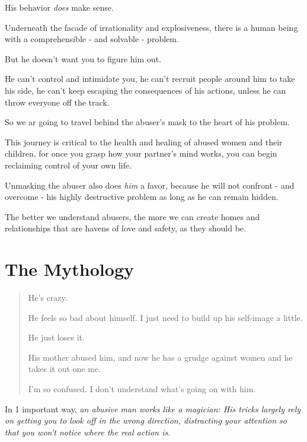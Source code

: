 \documentclass[oneside]{article}
\numberwithin{equation}{section}
\begin{document}
His behavior \textit{does} make sense.

Underneath the facade of irrationality and explosiveness, there is a human being with a comprehensible - and solvable - problem.

But he doesn't want you to figure him out.

%

He can't control and intimidate you, he can't recruit people around him to take his side, he can't keep escaping the consequences of his actions, unless he can throw everyone off the track.


So we ar going to travel behind the abuser's mask to the heart of his problem.

This journey is critical to the health and healing of abused women and their children, for once you grasp how your partner's mind works, you can begin reclaiming control of your own life.

Unmasking the abuser also does \textit{him} a favor, because he will not confront - and overcome - his highly destructive problem as long as he can remain hidden.

%
The better we understand abusers, the more we can create homes and relationships that are havens of love and safety, as they should be.


\section{The Mythology}
\begin{quotation}
    He's crazy.
    
    He feels so bad about himself. I just need to build up his self-image a little.
    
    He just loses it.
    
    
    His mother abused him, and now he has a grudge against women and he takes it out one me.
    
    I'm so confused. I don't understand what's going on with him.
\end{quotation}
In 1 important way, \textit{an abusive man works like a magician: His tricks largely rely on getting you to look off in the wrong direction, distracting your attention so that you won't notice where the real action is}.
\end{document}
